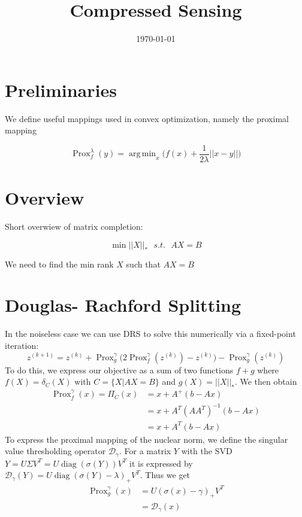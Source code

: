 \documentclass{article}
\title{Compressed Sensing}
\date{\today}
\numberwithin{equation}{section}
\DeclareMathOperator*{\argmin}{arg\,min}
\DeclareMathOperator{\Prox}{Prox}
\DeclareMathOperator{\diag}{diag}
\begin{document}
\maketitle

\section{Preliminaries}

We define useful mappings used in convex optimization, namely the proximal mapping

$$\Prox_f^\lambda(y) = \argmin_x \Big( f(x) + \frac{1}{2 \lambda} || x - y|| \Big)$$

\section{Overview}

Short overwiew of matrix completion:

$$\min ||X||_* \ \ \ s. t. \ \ \ AX = B$$

We need to find the min rank $X$ such that $AX = B$

\section{Douglas- Rachford Splitting}

In the noiseless case we can use DRS to solve this numerically via a fixed-point iteration: 
$$z^{(k+1)} = z^{(k)} + \Prox_{g}^\gamma\Big(2 \Prox_{f}^\gamma(z^{(k)}) - z^{(k)}\Big) - \Prox_{g}^\gamma(z^{(k)})$$
To do this, we express our objective as a sum of two functions $f + g$ where $f(X) = \delta_C(X)$ with $C = \lbrace X | AX = B \rbrace$ and $g(X) = ||X||_*$. We then obtain
\begin{align*}
\Prox_{f}^\gamma(x) = \Pi_C(x) &= x + A^+(b-Ax)
\\ &= x + A^T(A A^T)^{-1}(b - Ax)
\\ &= x + A^T(b-Ax)
\end{align*}
To express the proximal mapping of the nuclear norm, we define the singular value thresholding operator $\mathcal{D}_\gamma$. For a matrix $Y$ with the SVD
$Y = U \Sigma V^T = U \diag(\sigma(Y)) V^T$ it is expressed by $\mathcal{D}_\gamma (Y) = U \diag(\sigma(Y) - \lambda)_+ V^T$. Thus we get
\begin{align*}
\Prox_{g}^\gamma(x) &= U (\sigma(x) - \gamma)_{+} V^T
\\ &= \mathcal{D}_\gamma(x)
\end{align*}
\end{document}
